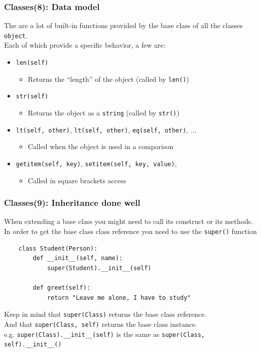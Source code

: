 \documentclass{beamer}
\newcommand{\pyfuncname}[2]{\texttt{\textunderscore\textunderscore#1\textunderscore\textunderscore#2}}
\begin{document}
\begin{frame}[fragile]
    \frametitle{Classes(8): Data model}
    The are a lot of built-in functions provided by the base class of all the classes \texttt{object}.\\
    Each of which provide a specific behavior, a few are:\\
    \begin{itemize}
        \item \pyfuncname{len}{(self)}
        \begin{itemize}
            \item Returns the ``length'' of the object (called by \texttt{len()})
        \end{itemize}
        \item \pyfuncname{str}{(self)}
        \begin{itemize}
            \item Returns the object as a \texttt{string} (called by \texttt{str()})
        \end{itemize}
        \item \pyfuncname{lt}{(self, other)}, \pyfuncname{lt}{(self, other)}, \pyfuncname{eq}{(self, other)}, ...
        \begin{itemize}
            \item Called when the object is used in a comparison 
        \end{itemize}
        \item \pyfuncname{getitem}{(self, key)}, \pyfuncname{setitem}{(self, key, value)}, 
        \begin{itemize}
            \item Called in square brackets access
        \end{itemize}
    \end{itemize}
\end{frame}

\begin{frame}[fragile]
    \frametitle{Classes(9): Inheritance done well}
    When extending a base class you might need to call its construct or its methods.\\
    In order to get the base class class reference you need to use the \texttt{super()} function
    \begin{verbatim}
    class Student(Person):
        def __init__(self, name):
            super(Student).__init__(self)

        def greet(self):
            return "Leave me alone, I have to study"
    \end{verbatim}
    Keep in mind that \texttt{super(Class)} returns the base class reference.\\
    And that \texttt{super(Class, self)} returns the base class instance.\\
    e.g. \texttt{super(Class).__init__(self)} is the same as \texttt{super(Class, self).__init__()}
\end{frame}
\end{document}

